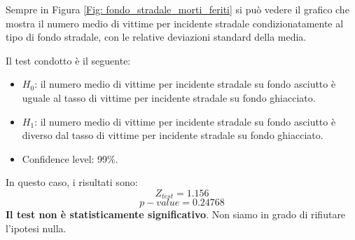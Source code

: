 \documentclass[12pt,a4paper,final,oneside]{article}			%
\begin{document}
        Sempre in Figura \ref{Fig: fondo_stradale_morti_feriti} si può vedere il grafico che mostra il numero medio di vittime per incidente stradale condizionatamente al tipo di fondo stradale, con le relative deviazioni standard della media.
        
        Il test condotto è il seguente:
        \begin{itemize}
            \item $H_0$: il numero medio di vittime per incidente stradale su fondo asciutto è uguale al tasso di vittime per incidente stradale su fondo ghiacciato.
            \item $H_1$: il numero medio di vittime per incidente stradale su fondo asciutto è diverso dal tasso di vittime per incidente stradale su fondo ghiacciato.
            \item Confidence level: 99\%.
        \end{itemize}
        In questo caso, i risultati sono:
        \[
            Z_{test} = 1.156
        \]
        \[
            p-value = 0.24768
        \]
        \textbf{Il test non è statisticamente significativo}. Non siamo in grado di rifiutare l’ipotesi nulla.
        
\end{document}
